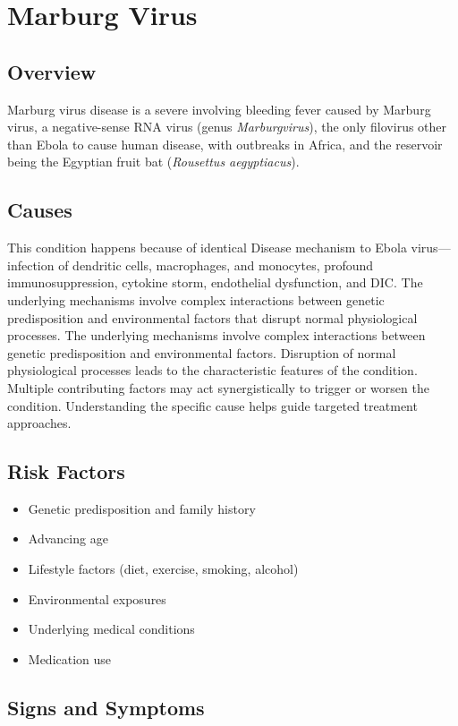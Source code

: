 \chapter{Marburg Virus}
\label{sec:Marburg Virus}

\section{Overview}
Marburg virus disease is a severe involving bleeding fever caused by Marburg virus, a negative-sense RNA virus (genus \textit{Marburgvirus}), the only filovirus other than Ebola to cause human disease, with outbreaks in Africa, and the reservoir being the Egyptian fruit bat (\textit{Rousettus aegyptiacus}).
\section{Causes}
This condition happens because of identical Disease mechanism to Ebola virus---infection of dendritic cells, macrophages, and monocytes, profound immunosuppression, cytokine storm, endothelial dysfunction, and DIC. The underlying mechanisms involve complex interactions between genetic predisposition and environmental factors that disrupt normal physiological processes. The underlying mechanisms involve complex interactions between genetic predisposition and environmental factors. Disruption of normal physiological processes leads to the characteristic features of the condition. Multiple contributing factors may act synergistically to trigger or worsen the condition. Understanding the specific cause helps guide targeted treatment approaches.
\section{Risk Factors}


\begin{itemize}[noitemsep]
  \item Genetic predisposition and family history
  \item Advancing age
  \item Lifestyle factors (diet, exercise, smoking, alcohol)
  \item Environmental exposures
  \item Underlying medical conditions
  \item Medication use
\end{itemize}
\section{Signs and Symptoms}

